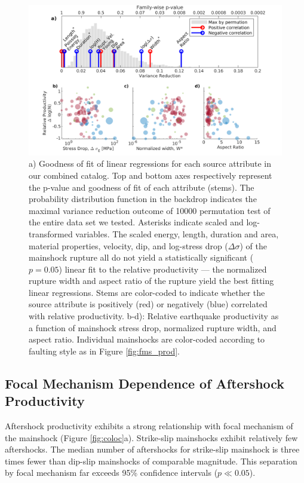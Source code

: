 \documentclass[draft]{agujournal2018}
\begin{document}
    \begin{figure}
        \centering
        \includegraphics[width = \linewidth]{figures/stem_plot.png}
        \caption{a) Goodness of fit of linear regressions for each source attribute in our combined catalog. Top and bottom axes respectively represent the p-value and goodness of fit of each attribute (stems). The probability distribution function in the backdrop indicates the maximal variance reduction outcome of 10000 permutation test of the entire data set we tested. Asterisks indicate scaled and log-transformed variables. The scaled energy, length, duration and area, material properties, velocity, dip, and log-stress drop ($\Delta\sigma$) of the mainshock rupture all do not yield a statistically significant ($p=0.05$) linear fit to the relative productivity — the normalized rupture width and aspect ratio of the rupture yield the best fitting linear regressions. Stems are color-coded to indicate whether the source attribute is positively (red) or negatively (blue) correlated with relative productivity. b-d): Relative earthquake productivity as a function of mainshock stress drop, normalized rupture width, and aspect ratio. Individual mainshocks are color-coded according to faulting style as in Figure \ref{fig:fms_prod}.}
        \label{fig:r2_finite_fault}
    \end{figure}
    
    \subsection{Focal Mechanism Dependence of Aftershock Productivity} 
    
    Aftershock productivity exhibits a strong relationship with focal mechanism of the mainshock (Figure \ref{fig:coloc}a). Strike-slip mainshocks exhibit relatively few aftershocks. The median number of aftershocks for strike-slip mainshock is three times fewer than dip-slip mainshocks of comparable magnitude. This separation by focal mechanism far exceeds 95\% confidence intervals ($p\ll 0.05$). 
    
\end{document}
